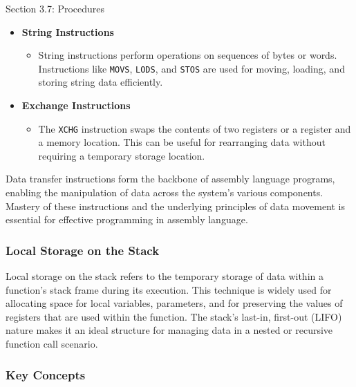 \begin{notes}{Section 3.7: Procedures}
\begin{itemize}
        \item \textbf{String Instructions}
        \begin{itemize}
            \item String instructions perform operations on sequences of bytes or words. Instructions like \texttt{MOVS}, \texttt{LODS}, and \texttt{STOS} are used for moving, loading, and storing 
            string data efficiently.
        \end{itemize}
        \item \textbf{Exchange Instructions}
        \begin{itemize}
            \item The \texttt{XCHG} instruction swaps the contents of two registers or a register and a memory location. This can be useful for rearranging data without requiring a temporary storage 
            location.
        \end{itemize}
    \end{itemize}
    
    Data transfer instructions form the backbone of assembly language programs, enabling the manipulation of data across the system's various components. Mastery of these instructions and the underlying 
    principles of data movement is essential for effective programming in assembly language.

    \subsubsection*{Local Storage on the Stack}

    Local storage on the stack refers to the temporary storage of data within a function's stack frame during its execution. This technique is widely used for allocating space for local variables, 
    parameters, and for preserving the values of registers that are used within the function. The stack's last-in, first-out (LIFO) nature makes it an ideal structure for managing data in a nested or 
    recursive function call scenario.
    
    \subsubsection*{Key Concepts}
    

\end{notes}
